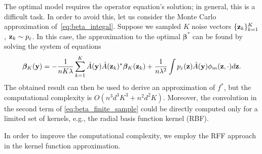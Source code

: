 The optimal model requires the operator equation's solution; in general,
this is a difficult task.
In order to avoid this, let us consider the Monte Carlo approximation
of~\eqref{eq:beta_integal}.
Suppose we sampled $K$ noise vectors $\{{\bf z}_k\}_{k = 1}^K$,
${\bf z}_k \sim p_{\varepsilon}$.
In this case, the approximation to the optimal ${\bm \beta}^*$ can be found
by solving the system of equations
\begin{equation}
    \label{eq:beta_finite_sample}
    {\bm \beta}_K({\bf y}) = -\frac{1}{nK\lambda}
    \sum\limits_{k = 1}^K
    \hat{A}({\bf y})\hat{A}({\bf z}_k)^*{\bm \beta}_K({\bf z}_k)
    + \frac{1}{n\lambda^2}\int p_{\varepsilon}({\bf z}) \hat{A}({\bf y}) \phi_m({\bf z}, \cdot)d{\bf z}.
\end{equation}
The obtained result can then be used to derive an approximation of $f^*$,
but the computational complexity is $O(n^3d^3K^3 + n^2d^2K)$.
Moreover, the convolution in the second term of \eqref{eq:beta_finite_sample} could be directly computed
only for a limited set of kernels, e.g., the radial basis function kernel (RBF).

In order to improve the computational complexity, we employ the RFF approach
in the kernel function approximation.

